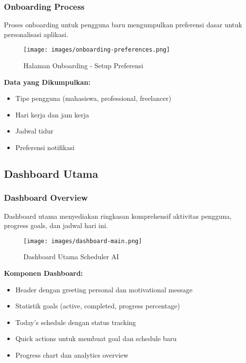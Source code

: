 \subsubsection{Onboarding Process}
Proses onboarding untuk pengguna baru mengumpulkan preferensi dasar untuk personalisasi aplikasi.

\begin{figure}[H]
\centering
\texttt{[image: images/onboarding-preferences.png]}
\caption{Halaman Onboarding - Setup Preferensi}
\label{fig:onboarding}
\end{figure}

\textbf{Data yang Dikumpulkan:}
\begin{itemize}
\item Tipe pengguna (mahasiswa, professional, freelancer)
\item Hari kerja dan jam kerja
\item Jadwal tidur
\item Preferensi notifikasi
\end{itemize}

\subsection{Dashboard Utama}

\subsubsection{Dashboard Overview}
Dashboard utama menyediakan ringkasan komprehensif aktivitas pengguna, progress goals, dan jadwal hari ini.

\begin{figure}[H]
\centering
\texttt{[image: images/dashboard-main.png]}
\caption{Dashboard Utama Scheduler AI}
\label{fig:dashboard-main}
\end{figure}

\textbf{Komponen Dashboard:}
\begin{itemize}
\item Header dengan greeting personal dan motivational message
\item Statistik goals (active, completed, progress percentage)
\item Today's schedule dengan status tracking
\item Quick actions untuk membuat goal dan schedule baru
\item Progress chart dan analytics overview
\end{itemize}

